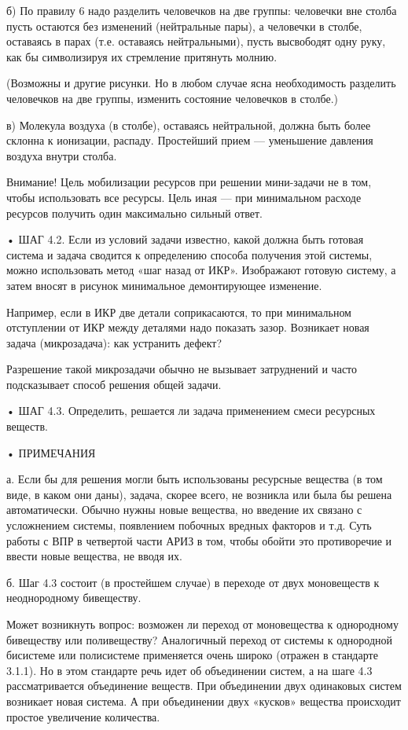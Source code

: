 б) По правилу 6 надо разделить человечков на две группы: человечки вне
столба пусть  остаются без  изменений (нейтральные пары),  а человечки
в  столбе,  оставаясь в  парах  (т.е.  оставаясь нейтральными),  пусть
высвободят  одну руку,  как  бы символизируя  их стремление  притянуть
молнию.

(Возможны  и другие  рисунки.  Но в  любом  случае ясна  необходимость
разделить человечков  на две  группы, изменить состояние  человечков в
столбе.)

в)  Молекула воздуха  (в столбе),  оставаясь нейтральной,  должна быть
более  склонна к  ионизации,  распаду. Простейший  прием —  уменьшение
давления воздуха внутри столба.

Внимание! Цель мобилизации ресурсов при  решении мини-задачи не в том,
чтобы использовать  все ресурсы. Цель  иная — при  минимальном расходе
ресурсов получить один максимально сильный ответ.


• ШАГ 4.2. Если из условий  задачи известно, какой должна быть готовая
система  и  задача  сводится  к  определению  способа  получения  этой
системы,  можно  использовать метод  «шаг  назад  от ИКР».  Изображают
готовую систему,  а затем  вносят в рисунок  минимальное демонтирующее
изменение.

Например,  если в  ИКР две  детали соприкасаются,  то при  минимальном
отступлении от ИКР между деталями надо показать зазор. Возникает новая
задача (микрозадача): как устранить дефект?

Разрешение такой  микрозадачи обычно  не вызывает затруднений  и часто
подсказывает способ решения общей задачи.


• ШАГ 4.3. Определить, решается  ли задача применением смеси ресурсных
веществ.

• ПРИМЕЧАНИЯ

а. Если бы  для решения могли быть использованы  ресурсные вещества (в
том виде,  в каком они  даны), задача,  скорее всего, не  возникла или
была бы решена автоматически. Обычно нужны новые вещества, но введение
их связано с усложнением системы, появлением побочных вредных факторов
и т.д. Суть  работы с ВПР в  четвертой части АРИЗ в  том, чтобы обойти
это противоречие и ввести новые вещества, не вводя их.

б.  Шаг  4.3  состоит  (в   простейшем  случае)  в  переходе  от  двух
моновеществ к неоднородному бивеществу.

Может  возникнуть  вопрос:  возможен  ли  переход  от  моновещества  к
однородному  бивеществу  или   поливеществу?  Аналогичный  переход  от
системы  к  однородной  бисистеме или  полисистеме  применяется  очень
широко (отражен в  стандарте 3.1.1). Но в этом стандарте  речь идет об
объединении систем, а на шаге 4.3 рассматривается объединение веществ.
При объединении двух одинаковых систем  возникает новая система. А при
объединении  двух  «кусков»  вещества  происходит  простое  увеличение
количества.

